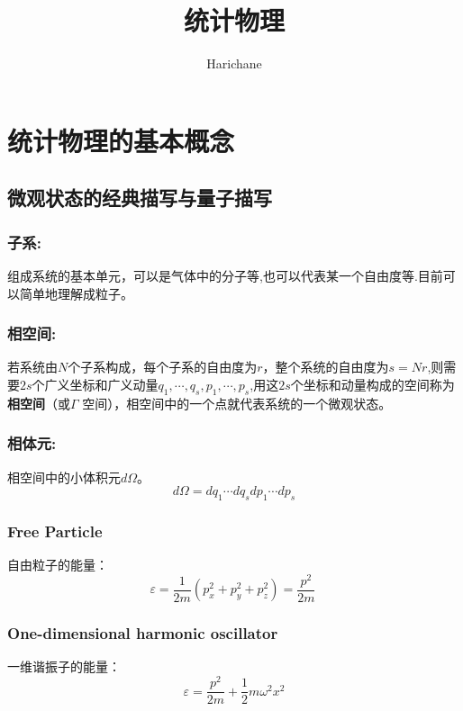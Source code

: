 \documentclass[12pt]{ctexart}
\title{\Huge{统计物理}}
\author{Harichane}
\numberwithin{equation}{subsection}
\begin{document}
\maketitle
\thispagestyle{empty}%
\newpage

\tableofcontents
{}
\setcounter{page}{1}
\setcounter{section}{5} 
\newpage%

\section{统计物理的基本概念}
	\setcounter{subsection}{1} %
	\subsection{微观状态的经典描写与量子描写}
  	\subsubsection{ 子系:}
  		组成系统的基本单元，可以是气体中的分子等,也可以代表某一个自由度等.目前可以简单地理解成粒子。
	\subsubsection{ 相空间:}
		若系统由$N$个子系构成，每个子系的自由度为$r$，整个系统的自由度为$s=Nr$,则需要$2s$个广义坐标和广义动量${q_1}, \cdots ,{q_s},{p_1}, \cdots ,{p_s}$,用这$2s$个坐标和动量构成的空间称为\textbf{相空间}（或$\Gamma$ 空间），相空间中的一个点就代表系统的一个微观状态。
	\subsubsection{ 相体元:}
		相空间中的小体积元$d\Omega$。
		\[d\Omega  = d{q_1} \cdots d{q_s}d{p_1} \cdots d{p_s}\]
  	\subsubsection{Free Particle}
  		自由粒子的能量：
		\begin{equation}
			\varepsilon  = \frac{1}{{2m}}\left( {p_x^2 + p_y^2 + p_z^2} \right) = \frac{{{p^2}}}{{2m}}\
		\end{equation}
	\subsubsection{One-dimensional harmonic oscillator}
		一维谐振子的能量：
		\begin{equation}
			\varepsilon  = \frac{{{p^2}}}{{2m}} + \frac{1}{2}m{\omega ^2}{x^2}
		\end{equation}
\end{document}
